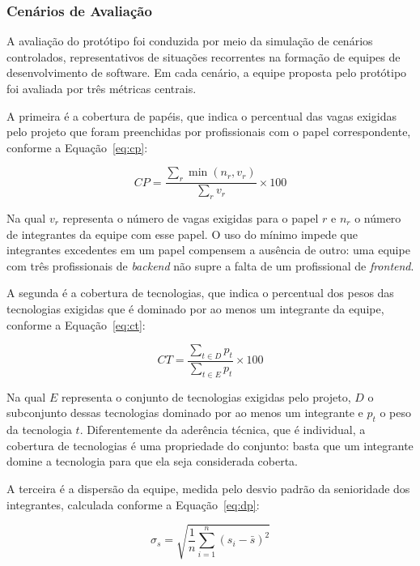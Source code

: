 \subsubsection{Cenários de Avaliação}

A avaliação do protótipo foi conduzida por meio da simulação de cenários controlados, representativos de situações recorrentes na formação de equipes de desenvolvimento de software. Em cada cenário, a equipe proposta pelo protótipo foi avaliada por três métricas centrais.

A primeira é a cobertura de papéis, que indica o percentual das vagas exigidas pelo projeto que foram preenchidas por profissionais com o papel correspondente, conforme a Equação~\ref{eq:cp}:

\begin{equation}
CP = \frac{\sum_{r} \min(n_r, v_r)}{\sum_{r} v_r} \times 100
\label{eq:cp}
\end{equation}

Na qual $v_r$ representa o número de vagas exigidas para o papel $r$ e $n_r$ o número de integrantes da equipe com esse papel. O uso do mínimo impede que integrantes excedentes em um papel compensem a ausência de outro: uma equipe com três profissionais de \textit{backend} não supre a falta de um profissional de \textit{frontend}.

A segunda é a cobertura de tecnologias, que indica o percentual dos pesos das tecnologias exigidas que é dominado por ao menos um integrante da equipe, conforme a Equação~\ref{eq:ct}:

\begin{equation}
CT = \frac{\sum_{t \in D} p_t}{\sum_{t \in E} p_t} \times 100
\label{eq:ct}
\end{equation}

Na qual $E$ representa o conjunto de tecnologias exigidas pelo projeto, $D$ o subconjunto dessas tecnologias dominado por ao menos um integrante e $p_t$ o peso da tecnologia $t$. Diferentemente da aderência técnica, que é individual, a cobertura de tecnologias é uma propriedade do conjunto: basta que um integrante domine a tecnologia para que ela seja considerada coberta.

A terceira é a dispersão da equipe, medida pelo desvio padrão da senioridade dos integrantes, calculada conforme a Equação~\ref{eq:dp}:

\begin{equation}
\sigma_s = \sqrt{\frac{1}{n} \sum_{i=1}^{n} \left(s_i - \bar{s}\right)^2}
\label{eq:dp}
\end{equation}

